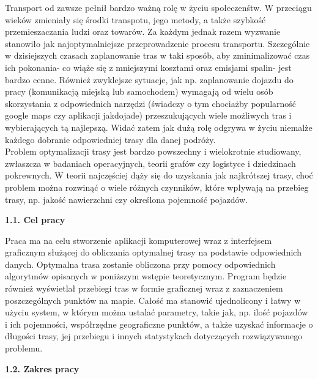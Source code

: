 \documentclass[a4paper, twoside, 12pt, justified]{article}
\begin{document}
	Transport od zawsze pełnił bardzo ważną rolę w życiu społeczenśtw. W przeciągu wieków zmieniały się środki transpotu, jego metody, a także szybkość przemieszaczania ludzi oraz towarów. Za każdym jednak razem wyzwanie stanowiło jak najoptymalniejsze przeprowadzenie procesu transportu.
	Szczególnie w dzisiejszych czasach zaplanowanie tras w taki sposób, aby zminimalizować czas ich pokonania- co wiąże się z mniejszymi kosztami oraz emisjami spalin- jest bardzo cenne. Również zwyklejsze sytuacje, jak np. zaplanowanie dojazdu do pracy (komunikacją miejską lub samochodem) wymagają od wielu osób skorzystania z odpowiednich narzędzi (świadczy o tym chociażby popularność google maps czy aplikacji jakdojade) przeszukujących wiele możliwych tras i wybierających tą najlepszą. Widać zatem jak dużą rolę odgrywa w życiu niemalże każdego dobranie odpowiedniej trasy dla danej podróży.\\ 
	Problem optymalizacji trasy jest bardzo powszechny i wielokrotnie studiowany, zwłaszcza w badaniach operacyjnych, teorii grafów czy logistyce i dziedzinach pokrewnych. W teorii najczęściej dąży się do uzyskania jak najkrótszej trasy, choć problem można rozwinąć o wiele różnych czynników, które wpływają na przebieg trasy, np. jakość nawierzchni czy określona pojemność pojazdów.
	\vspace{5mm} %
	
	\begin{flushleft}
		\begin{large}
			\textbf{1.1. Cel pracy}
		\end{large}
	\end{flushleft}
	\vspace{5mm} %
	
	Praca ma na celu stworzenie aplikacji komputerowej wraz z interfejsem graficznym służącej do obliczania optymalnej trasy na podstawie odpowiednich danych. Optymalna trasa zostanie obliczona przy pomocy odpowiednich algorytmów opisanych w poniższym wstępie teoretycznym. Program będzie również wyświetlał przebiegi tras w formie graficznej wraz z zaznaczeniem poszczególnych punktów na mapie. Całość ma stanowić ujednolicony i łatwy w użyciu system, w którym można ustalać parametry, takie jak, np. ilość pojazdów i ich pojemności, współrzędne geograficzne punktów, a także uzyskać informacje o długości trasy, jej przebiegu i innych statystykach dotyczących rozwiązywanego problemu.  
	\vspace{5mm} %
	
	\begin{flushleft}
		\begin{large}
			\textbf{1.2. Zakres pracy}
		\end{large}
	\end{flushleft}
	\vspace{5mm} %
	
\end{document}
